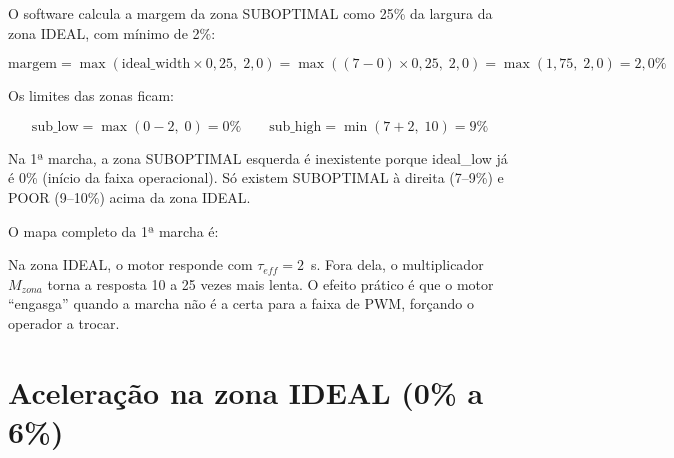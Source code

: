 O software calcula a margem da zona SUBOPTIMAL como 25\% da largura da zona IDEAL, com mínimo de 2\%:

\begin{equation*}
	\text{margem} = \max(\text{ideal\_width} \times 0{,}25,\; 2{,}0) = \max((7 - 0) \times 0{,}25,\; 2{,}0) = \max(1{,}75,\; 2{,}0) = 2{,}0\%
\end{equation*}

Os limites das zonas ficam:

\begin{equation*}
	\text{sub\_low} = \max(0 - 2,\; 0) = 0\% \qquad \text{sub\_high} = \min(7 + 2,\; 10) = 9\%
\end{equation*}

Na 1ª marcha, a zona SUBOPTIMAL esquerda é inexistente porque ideal\_low já é 0\% (início da faixa operacional). Só existem SUBOPTIMAL à direita (7--9\%) e POOR (9--10\%) acima da zona IDEAL.

O mapa completo da 1ª marcha é:

\begin{table}[!h]
\captionsetup{width=16cm}
\end{table}

Na zona IDEAL, o motor responde com $\tau_{eff} = 2$~s. Fora dela, o multiplicador $M_{zona}$ torna a resposta 10 a 25 vezes mais lenta. O efeito prático é que o motor ``engasga'' quando a marcha não é a certa para a faixa de PWM, forçando o operador a trocar.

\section*{Aceleração na zona IDEAL (0\% a 6\%)}

